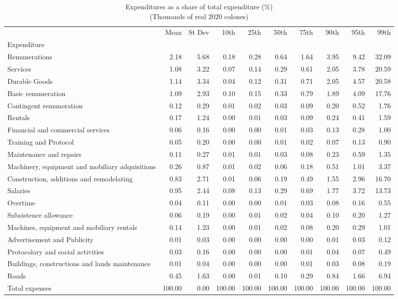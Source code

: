 \begin{table}[h]
\centering
\caption{Expenditures as a share of total expenditure (\%)\\(Thousands of real 2020 colones)}
\begin{tabular}{lrrrrrrrrr}
\toprule
 & Mean & St Dev & 10th & 25th & 50th & 75th & 90th & 95th & 99th \\
Expenditure &  &  &  &  &  &  &  &  &  \\
\midrule
Remunerations & 2.18 & 5.68 & 0.18 & 0.28 & 0.64 & 1.64 & 3.95 & 9.42 & 32.09 \\
Services & 1.08 & 3.22 & 0.07 & 0.14 & 0.29 & 0.61 & 2.05 & 3.78 & 20.59 \\
Durable Goods & 1.14 & 3.34 & 0.04 & 0.12 & 0.31 & 0.71 & 2.05 & 4.57 & 20.58 \\
Basic remuneration & 1.09 & 2.93 & 0.10 & 0.15 & 0.33 & 0.79 & 1.89 & 4.09 & 17.76 \\
Contingent remuneration & 0.12 & 0.29 & 0.01 & 0.02 & 0.03 & 0.09 & 0.20 & 0.52 & 1.76 \\
Rentals & 0.17 & 1.24 & 0.00 & 0.01 & 0.03 & 0.09 & 0.24 & 0.41 & 1.59 \\
Financial and commercial services & 0.06 & 0.16 & 0.00 & 0.00 & 0.01 & 0.03 & 0.13 & 0.28 & 1.00 \\
Training and Protocol & 0.05 & 0.20 & 0.00 & 0.00 & 0.01 & 0.02 & 0.07 & 0.13 & 0.90 \\
Maintenance and repairs & 0.11 & 0.27 & 0.01 & 0.01 & 0.03 & 0.08 & 0.23 & 0.59 & 1.35 \\
Machinery, equipment and mobiliary adquisitions & 0.26 & 0.87 & 0.01 & 0.02 & 0.06 & 0.18 & 0.51 & 1.01 & 3.37 \\
Construction, additions and remodelating & 0.83 & 2.71 & 0.01 & 0.06 & 0.19 & 0.49 & 1.55 & 2.96 & 16.70 \\
Salaries & 0.95 & 2.44 & 0.08 & 0.13 & 0.29 & 0.69 & 1.77 & 3.72 & 13.73 \\
Overtime & 0.04 & 0.11 & 0.00 & 0.00 & 0.01 & 0.03 & 0.08 & 0.16 & 0.55 \\
Subsistence allowance & 0.06 & 0.19 & 0.00 & 0.01 & 0.02 & 0.04 & 0.10 & 0.20 & 1.27 \\
Machines, equipment and mobiliary rentals & 0.14 & 1.23 & 0.00 & 0.01 & 0.02 & 0.08 & 0.20 & 0.29 & 1.01 \\
Advertisement and Publicity & 0.01 & 0.03 & 0.00 & 0.00 & 0.00 & 0.00 & 0.01 & 0.03 & 0.12 \\
Protocolary and social activities & 0.03 & 0.16 & 0.00 & 0.00 & 0.00 & 0.01 & 0.04 & 0.07 & 0.49 \\
Buildings, constructions and lands maintenance & 0.01 & 0.04 & 0.00 & 0.00 & 0.00 & 0.01 & 0.03 & 0.08 & 0.19 \\
Roads & 0.45 & 1.63 & 0.00 & 0.01 & 0.10 & 0.29 & 0.84 & 1.66 & 6.94 \\
Total expenses & 100.00 & 0.00 & 100.00 & 100.00 & 100.00 & 100.00 & 100.00 & 100.00 & 100.00 \\
\bottomrule
\end{tabular}
\end{table}
